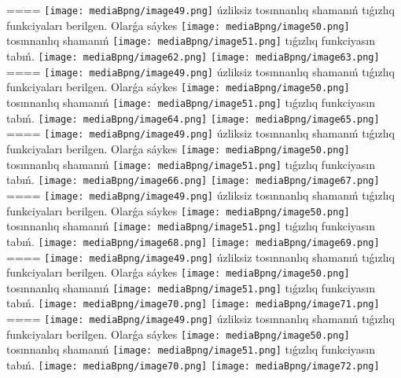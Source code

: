 ====
\texttt{[image: mediaBpng/image49.png]} úzliksiz tosınnanlıq shamanıń tıǵızlıq funkciyaları berilgen. Olarǵa sáykes \texttt{[image: mediaBpng/image50.png]} tosınnanlıq shamanıń \texttt{[image: mediaBpng/image51.png]} tıǵızlıq funkciyasın tabıń. \texttt{[image: mediaBpng/image62.png]} \texttt{[image: mediaBpng/image63.png]}
====
\texttt{[image: mediaBpng/image49.png]} úzliksiz tosınnanlıq shamanıń tıǵızlıq funkciyaları berilgen. Olarǵa sáykes \texttt{[image: mediaBpng/image50.png]} tosınnanlıq shamanıń \texttt{[image: mediaBpng/image51.png]} tıǵızlıq funkciyasın tabıń. \texttt{[image: mediaBpng/image64.png]} \texttt{[image: mediaBpng/image65.png]}
====
\texttt{[image: mediaBpng/image49.png]} úzliksiz tosınnanlıq shamanıń tıǵızlıq funkciyaları berilgen. Olarǵa sáykes \texttt{[image: mediaBpng/image50.png]} tosınnanlıq shamanıń \texttt{[image: mediaBpng/image51.png]} tıǵızlıq funkciyasın tabıń. \texttt{[image: mediaBpng/image66.png]} \texttt{[image: mediaBpng/image67.png]}
====
\texttt{[image: mediaBpng/image49.png]} úzliksiz tosınnanlıq shamanıń tıǵızlıq funkciyaları berilgen. Olarǵa sáykes \texttt{[image: mediaBpng/image50.png]} tosınnanlıq shamanıń \texttt{[image: mediaBpng/image51.png]} tıǵızlıq funkciyasın tabıń. \texttt{[image: mediaBpng/image68.png]} \texttt{[image: mediaBpng/image69.png]}
====
\texttt{[image: mediaBpng/image49.png]} úzliksiz tosınnanlıq shamanıń tıǵızlıq funkciyaları berilgen. Olarǵa sáykes \texttt{[image: mediaBpng/image50.png]} tosınnanlıq shamanıń \texttt{[image: mediaBpng/image51.png]} tıǵızlıq funkciyasın tabıń. \texttt{[image: mediaBpng/image70.png]} \texttt{[image: mediaBpng/image71.png]}
====
\texttt{[image: mediaBpng/image49.png]} úzliksiz tosınnanlıq shamanıń tıǵızlıq funkciyaları berilgen. Olarǵa sáykes \texttt{[image: mediaBpng/image50.png]} tosınnanlıq shamanıń \texttt{[image: mediaBpng/image51.png]} tıǵızlıq funkciyasın tabıń. \texttt{[image: mediaBpng/image70.png]} \texttt{[image: mediaBpng/image72.png]}
